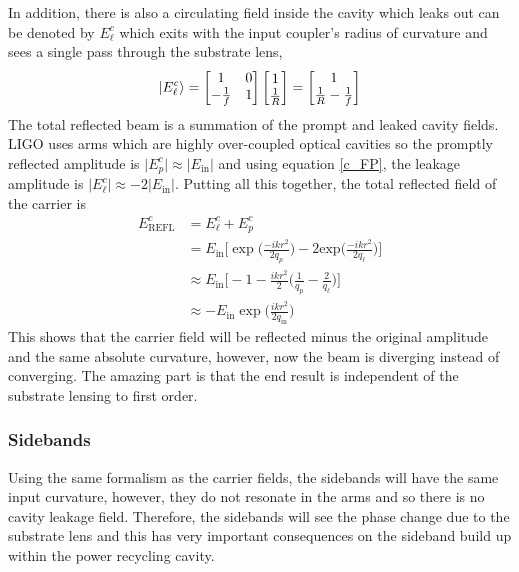 		In addition, there is also a circulating field inside the cavity which leaks out can be denoted by $E^c_{\ell}$ which exits with the input coupler's radius of curvature and sees a single pass through the substrate lens,
		\begin{equation}\label{eq:leakE}
		\ket{E^c_{\ell}} = 		 
		\begin{bmatrix}
		1 	&	0 
		\\ 	-\frac{1}{f} 	&	1
		\end{bmatrix}
		\begin{bmatrix}
		1  
		\\ 	\frac{1}{R}
		\end{bmatrix}
		=
		\begin{bmatrix}
		1  
		\\ 	\frac{1}{R} - \frac{1}{f}
		\end{bmatrix}
		\end{equation}
		The total reflected beam is a summation of the prompt and leaked cavity fields.  LIGO uses arms which are highly over-coupled optical cavities so the promptly reflected amplitude is $\vert E^c_p \vert \approx \vert E_{\text{in}} \vert$ and using equation \ref{c_FP}, the leakage amplitude is $\vert E^c_\ell \vert \approx -2\vert E_{\text{in}} \vert$.  Putting all this together, the total reflected field of the carrier is
		\begin{equation}
		\begin{aligned}
		E^c_{\text{REFL}} 	&= E^c_{\ell} + E^c_p \\
							&= E_{\text{in}} \bigg[ \exp \bigg(\frac{-ik r^2}{2q_p}\bigg) - 2  \text{exp} \bigg(\frac{-ik r^2}{2q_{\ell}}\bigg) \bigg]\\
							&\approx E_{\text{in}} \bigg[ -1 - \frac{ikr^2}{2} \bigg( \frac{1}{q_p} - \frac{2}{q_\ell} \bigg) \bigg]\\
							&\approx -E_{\text{in}} \exp\bigg(\frac{ikr^2}{2q_{\text{in}}}\bigg) 
		\end{aligned} 
		\end{equation}
		This shows that the carrier field will be reflected minus the original amplitude and the same absolute curvature, however, now the beam is diverging instead of converging.  The amazing part is that the end result is independent of the substrate lensing to first order.
		
		\subsubsection{Sidebands}
		Using the same formalism as the carrier fields, the sidebands will have the same input curvature, however, they do not resonate in the arms and so there is no cavity leakage field.  Therefore, the sidebands will see the phase change due to the substrate lens and this has very important consequences on the sideband build up within the power recycling cavity.
		
